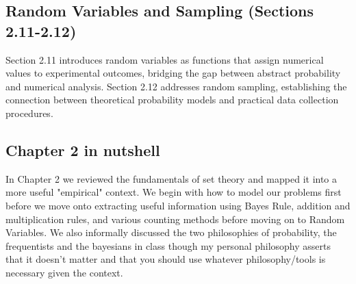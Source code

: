 \documentclass[12pt]{article}
\begin{document}
\subsection*{Random Variables and Sampling (Sections 2.11-2.12)}
Section 2.11 introduces random variables as functions that assign numerical values to experimental outcomes, bridging the gap between abstract probability and numerical analysis. Section 2.12 addresses random sampling, establishing the connection between theoretical probability models and practical data collection procedures.

\subsection*{Chapter 2 in nutshell}
In Chapter 2 we reviewed the fundamentals of set theory and mapped it into a more useful "empirical" context. We begin with how to model our problems first before we move onto extracting useful information using Bayes Rule, addition and multiplication rules, and various counting methods before moving on to Random Variables. We also informally discussed the two philosophies of probability, the frequentists and the bayesians in class though my personal philosophy asserts that it doesn't matter and that you should use whatever philosophy/tools is necessary given the context. 
\end{document}
